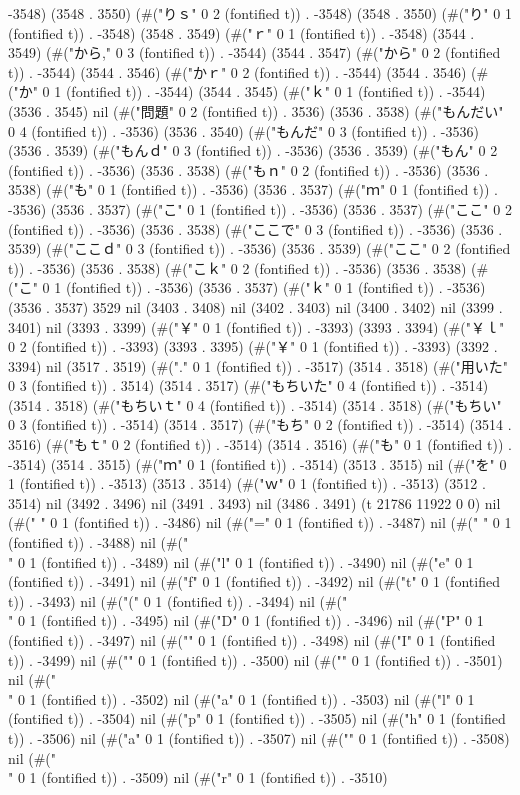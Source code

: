 -3548) (3548 . 3550) (#("りｓ" 0 2 (fontified t)) . -3548) (3548 . 3550) (#("り" 0 1 (fontified t)) . -3548) (3548 . 3549) (#("ｒ" 0 1 (fontified t)) . -3548) (3544 . 3549) (#("から," 0 3 (fontified t)) . -3544) (3544 . 3547) (#("から" 0 2 (fontified t)) . -3544) (3544 . 3546) (#("かｒ" 0 2 (fontified t)) . -3544) (3544 . 3546) (#("か" 0 1 (fontified t)) . -3544) (3544 . 3545) (#("ｋ" 0 1 (fontified t)) . -3544) (3536 . 3545) nil (#("問題" 0 2 (fontified t)) . 3536) (3536 . 3538) (#("もんだい" 0 4 (fontified t)) . -3536) (3536 . 3540) (#("もんだ" 0 3 (fontified t)) . -3536) (3536 . 3539) (#("もんｄ" 0 3 (fontified t)) . -3536) (3536 . 3539) (#("もん" 0 2 (fontified t)) . -3536) (3536 . 3538) (#("もｎ" 0 2 (fontified t)) . -3536) (3536 . 3538) (#("も" 0 1 (fontified t)) . -3536) (3536 . 3537) (#("ｍ" 0 1 (fontified t)) . -3536) (3536 . 3537) (#("こ" 0 1 (fontified t)) . -3536) (3536 . 3537) (#("ここ" 0 2 (fontified t)) . -3536) (3536 . 3538) (#("ここで" 0 3 (fontified t)) . -3536) (3536 . 3539) (#("ここｄ" 0 3 (fontified t)) . -3536) (3536 . 3539) (#("ここ" 0 2 (fontified t)) . -3536) (3536 . 3538) (#("こｋ" 0 2 (fontified t)) . -3536) (3536 . 3538) (#("こ" 0 1 (fontified t)) . -3536) (3536 . 3537) (#("ｋ" 0 1 (fontified t)) . -3536) (3536 . 3537) 3529 nil (3403 . 3408) nil (3402 . 3403) nil (3400 . 3402) nil (3399 . 3401) nil (3393 . 3399) (#("￥" 0 1 (fontified t)) . -3393) (3393 . 3394) (#("￥ｌ" 0 2 (fontified t)) . -3393) (3393 . 3395) (#("￥" 0 1 (fontified t)) . -3393) (3392 . 3394) nil (3517 . 3519) (#("." 0 1 (fontified t)) . -3517) (3514 . 3518) (#("用いた" 0 3 (fontified t)) . 3514) (3514 . 3517) (#("もちいた" 0 4 (fontified t)) . -3514) (3514 . 3518) (#("もちいｔ" 0 4 (fontified t)) . -3514) (3514 . 3518) (#("もちい" 0 3 (fontified t)) . -3514) (3514 . 3517) (#("もち" 0 2 (fontified t)) . -3514) (3514 . 3516) (#("もｔ" 0 2 (fontified t)) . -3514) (3514 . 3516) (#("も" 0 1 (fontified t)) . -3514) (3514 . 3515) (#("ｍ" 0 1 (fontified t)) . -3514) (3513 . 3515) nil (#("を" 0 1 (fontified t)) . -3513) (3513 . 3514) (#("ｗ" 0 1 (fontified t)) . -3513) (3512 . 3514) nil (3492 . 3496) nil (3491 . 3493) nil (3486 . 3491) (t 21786 11922 0 0) nil (#(" " 0 1 (fontified t)) . -3486) nil (#("=" 0 1 (fontified t)) . -3487) nil (#(" " 0 1 (fontified t)) . -3488) nil (#("\\" 0 1 (fontified t)) . -3489) nil (#("l" 0 1 (fontified t)) . -3490) nil (#("e" 0 1 (fontified t)) . -3491) nil (#("f" 0 1 (fontified t)) . -3492) nil (#("t" 0 1 (fontified t)) . -3493) nil (#("(" 0 1 (fontified t)) . -3494) nil (#("\\" 0 1 (fontified t)) . -3495) nil (#("D" 0 1 (fontified t)) . -3496) nil (#("P" 0 1 (fontified t)) . -3497) nil (#("{" 0 1 (fontified t)) . -3498) nil (#("I" 0 1 (fontified t)) . -3499) nil (#("}" 0 1 (fontified t)) . -3500) nil (#("{" 0 1 (fontified t)) . -3501) nil (#("\\" 0 1 (fontified t)) . -3502) nil (#("a" 0 1 (fontified t)) . -3503) nil (#("l" 0 1 (fontified t)) . -3504) nil (#("p" 0 1 (fontified t)) . -3505) nil (#("h" 0 1 (fontified t)) . -3506) nil (#("a" 0 1 (fontified t)) . -3507) nil (#("}" 0 1 (fontified t)) . -3508) nil (#("\\" 0 1 (fontified t)) . -3509) nil (#("r" 0 1 (fontified t)) . -3510) 